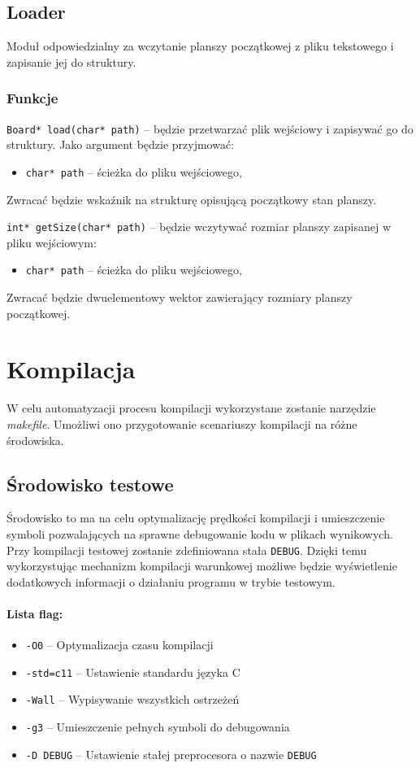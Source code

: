 \documentclass{article}
\begin{document}
\subsection{Loader}
Moduł odpowiedzialny za wczytanie planszy początkowej z pliku tekstowego i zapisanie jej do struktury.

\subsubsection{Funkcje}
\texttt{Board* load(char* path)} -- będzie przetwarzać plik wejściowy i zapisywać go do struktury. Jako argument będzie przyjmować:
\begin{itemize}[label={}]
	\item \texttt{char* path} -- ścieżka do pliku wejściowego,
\end{itemize}
Zwracać będzie wskaźnik na strukturę opisującą początkowy stan planszy.
\vspace{5mm}

\noindent{}\texttt{int* getSize(char* path)} -- będzie wczytywać rozmiar planszy zapisanej w pliku wejściowym:
\begin{itemize}[label={}]
	\item \texttt{char* path} -- ścieżka do pliku wejściowego,
\end{itemize}
Zwracać będzie dwuelementowy wektor zawierający rozmiary planszy początkowej.

\section{Kompilacja}
W celu automatyzacji procesu kompilacji wykorzystane zostanie narzędzie \textit{makefile}. Umożliwi ono przygotowanie scenariuszy kompilacji na różne środowiska.

\subsection{Środowisko testowe}
Środowisko to ma na celu optymalizację prędkości kompilacji i umieszczenie symboli pozwalających na sprawne debugowanie kodu w plikach wynikowych. Przy kompilacji testowej zostanie zdefiniowana stała \texttt{DEBUG}. Dzięki temu wykorzystując mechanizm kompilacji warunkowej możliwe będzie wyświetlenie dodatkowych informacji o działaniu programu w trybie testowym.

\paragraph{Lista flag:}
\begin{itemize}
	\item \texttt{-O0} -- Optymalizacja czasu kompilacji
	\item \texttt{-std=c11} -- Ustawienie standardu języka C
	\item \texttt{-Wall} -- Wypisywanie wszystkich ostrzeżeń
	\item \texttt{-g3} -- Umieszczenie pełnych symboli do debugowania
	\item \texttt{-D DEBUG} -- Ustawienie stałej preprocesora o nazwie \texttt{DEBUG}
\end{itemize}
\end{document}
